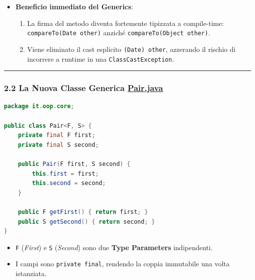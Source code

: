 \documentclass[11pt,a4paper]{article}
\newcommand{\passthrough}[1]{#1}
\providecommand{\tightlist}{\setlength{\itemsep}{0pt}\setlength{\parskip}{0pt}}
\begin{document}
\begin{itemize}
\tightlist
\item
  \textbf{Beneficio immediato del Generics}:

  \begin{enumerate}
  \def\labelenumi{\arabic{enumi}.}
  \tightlist
  \item
    La firma del metodo diventa fortemente tipizzata a compile-time:
    \passthrough{\lstinline!compareTo(Date other)!} anziché
    \passthrough{\lstinline!compareTo(Object other)!}.
  \item
    Viene eliminato il cast esplicito
    \passthrough{\lstinline!(Date) other!}, azzerando il rischio di
    incorrere a runtime in una
    \passthrough{\lstinline!ClassCastException!}.
  \end{enumerate}
\end{itemize}

\begin{center}\rule{0.5\linewidth}{0.5pt}\end{center}

\subsubsection{\texorpdfstring{2.2 La Nuova Classe Generica
\href{file:///home/wally/Documenti/GitHub/Programmazione-II/25-26/Teoria-e-Esercitazioni/Codice-20260902/Lezione14/MavenDate/src/main/java/it/oop/core/Pair.java}{Pair.java}}{2.2 La Nuova Classe Generica Pair.java}}\label{la-nuova-classe-generica-pair.java}

\begin{lstlisting}[language=Java]
package it.oop.core;

public class Pair<F, S> {
    private final F first;
    private final S second;

    public Pair(F first, S second) {
        this.first = first;
        this.second = second;
    }

    public F getFirst() { return first; }
    public S getSecond() { return second; }
}
\end{lstlisting}

\begin{itemize}
\tightlist
\item
  \passthrough{\lstinline!F!} (\emph{First}) e
  \passthrough{\lstinline!S!} (\emph{Second}) sono due \textbf{Type
  Parameters} indipendenti.
\item
  I campi sono \passthrough{\lstinline!private final!}, rendendo la
  coppia immutabile una volta istanziata.
\end{itemize}
\end{document}

